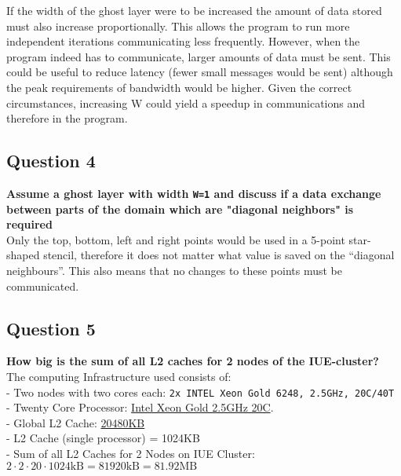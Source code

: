 If the width of the ghost layer were to be increased the amount of data stored must also increase proportionally. 
This allows the program to run more independent iterations communicating less frequently. However, when the program indeed has to communicate, 
larger amounts of data must be sent. This could be useful to reduce latency (fewer small messages would be sent) although the peak requirements of 
bandwidth would be higher. Given the correct circumstances, increasing W could yield a speedup in communications and therefore in the program.

\pagebreak


\subsection*{Question 4}
\textbf{Assume a ghost layer with width \texttt{W=1}  and discuss if a data exchange between parts of the domain which
 are "diagonal neighbors" is required} \\

 Only the top, bottom, left and right points would be used in a 5-point star-shaped stencil, therefore it does not matter what value is saved 
 on the “diagonal neighbours”. This also means that no changes to these points must be communicated. 

\subsection*{Question 5}
\textbf{How big is the sum of all L2 caches for 2 nodes of the IUE-cluster?} \\

The computing Infrastructure used consists of: \\
 - Two nodes with two cores each:  \texttt{2x INTEL Xeon Gold 6248, 2.5GHz, 20C/40T} \\
 - Twenty Core Processor: \href{https://www.dell.com/en-us/work/shop/intel-xeon-gold-6248-25ghz-twenty-core-processor-20c-40t-104gt-s-275m-cache-turbo-ht-150w-ddr4-2933/apd/338-brvk/processors}{Intel Xeon Gold 2.5GHz 20C}. \\
 - Global L2 Cache: \href{https://www.server2u.com/shop/6248-intel-xeon-gold-6248-2-5ghz-3-9ghz-turbo-20c-40t-150-watt-12434?page=39&category=12#attr=42856,44542,46231,47917,49603,52132,55504,57190,58876,60462,62048,64190 }{20480KB} \\
 - L2 Cache (single processor) = 1024KB \\
 - Sum of all L2 Caches for 2 Nodes on IUE Cluster: $2 \cdot 2 \cdot 20 \cdot 1024 \text{kB} = 81920 \text{kB} =  81.92 \text{MB}$
